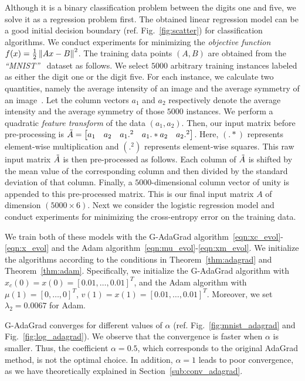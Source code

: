 Although it is a binary classification problem between the digits one and five, we solve it as a regression problem first. The obtained linear regression model can be a good initial decision boundary (ref. Fig.~\ref{fig:scatter}) for classification algorithms.
We conduct experiments for minimizing the {\em objective function} $f(x)=\frac{1}{2}\left\lVert Ax-B\right\rVert ^2$. The training data points $(A,B)$ are obtained from the \textit{``MNIST''}~\cite{MNIST} dataset as follows. We select $5000$ arbitrary training instances labeled as either the digit one or the digit five. For each instance, we calculate two quantities, namely the average intensity of an image and the average symmetry of an image~\cite{abu2012learning}. Let the column vectors $a_1$ and $a_2$ respectively denote the average intensity and the average symmetry of those $5000$ instances. We perform a quadratic {\em feature transform} of the data $(a_1,a_2)$. Then, our input matrix before pre-processing is $\Tilde{A} = \begin{bmatrix} a_1 & a_2 & a_1.^2 & a_1.*a_2 & a_2.^2 \end{bmatrix}$. Here, $(.*)$ represents element-wise multiplication and $(.^2)$ represents element-wise squares. This raw input matrix $\Tilde{A}$ is then pre-processed as follows. Each column of $\Tilde{A}$ is shifted by the mean value of the corresponding column and then divided by the standard deviation of that column. Finally, a $5000$-dimensional column vector of unity is appended to this pre-processed matrix. This is our final input matrix $A$ of dimension $(5000 \times 6)$. Next we consider the logistic regression model and conduct experiments for minimizing the cross-entropy error on the training data.

We train both of these models with the G-AdaGrad algorithm~\eqref{eqn:xc_evol}-\eqref{eqn:x_evol} and the Adam algorithm~\eqref{eqn:mu_evol}-\eqref{eqn:xm_evol}. We initialize the algorithms according to the conditions in Theorem~\ref{thm:adagrad} and Theorem~\ref{thm:adam}. Specifically, we initialize the G-AdaGrad algorithm with $x_c(0) = x(0) = [0.01,\ldots,0.01]^T$, and the Adam algorithm with $\mu(1) = [0,\ldots,0]^T$, $v(1) = x(1) = [0.01,\ldots,0.01]^T$. Moreover, we set $\lambda_2 = 0.0067$ for Adam.

G-AdaGrad converges for different values of $\alpha$ (ref. Fig.~\ref{fig:mnist_adagrad} and Fig.~\ref{fig:log_adagrad}). We observe that the convergence is faster when $\alpha$ is smaller. Thus, the coefficient $\alpha = 0.5$, which corresponds to the original AdaGrad method, is not the optimal choice. In addition, $\alpha=1$ leads to poor convergence, as we have theoretically explained in Section~\ref{sub:conv_adagrad}.

